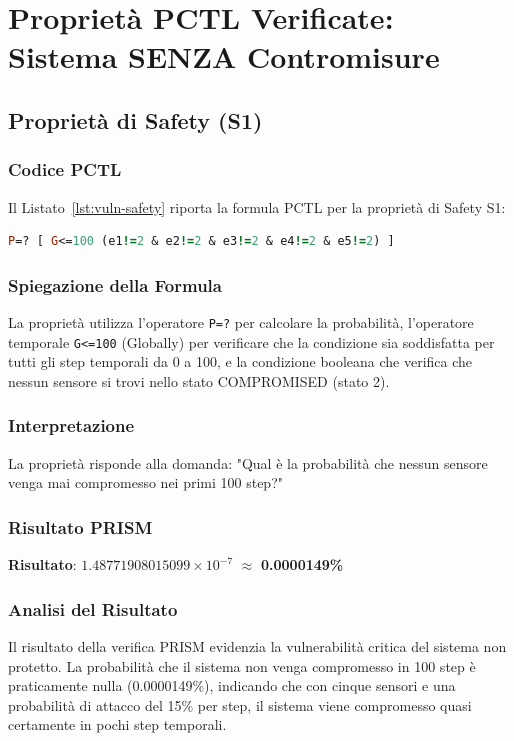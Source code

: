 \section{Proprietà PCTL Verificate: Sistema SENZA Contromisure}

\subsection{Proprietà di Safety (S1)}

\subsubsection{Codice PCTL}
Il Listato~\ref{lst:vuln-safety} riporta la formula PCTL per la proprietà di Safety S1:
\begin{lstlisting}[style=mystyle, language=Prolog, caption={Proprietà Safety S1 (vulnerabile)}, label=lst:vuln-safety]
P=? [ G<=100 (e1!=2 & e2!=2 & e3!=2 & e4!=2 & e5!=2) ]
\end{lstlisting}

\subsubsection{Spiegazione della Formula}
La proprietà utilizza l'operatore \texttt{P=?} per calcolare la probabilità, l'operatore temporale \texttt{G<=100} (Globally) per verificare che la condizione sia soddisfatta per tutti gli step temporali da 0 a 100, e la condizione booleana che verifica che nessun sensore si trovi nello stato COMPROMISED (stato 2).

\subsubsection{Interpretazione}
La proprietà risponde alla domanda: "Qual è la probabilità che nessun sensore venga mai compromesso nei primi 100 step?"

\subsubsection{Risultato PRISM}
\textbf{Risultato}: $1.48771908015099 \times 10^{-7}$ $\approx$ \textbf{0.0000149\%}

\subsubsection{Analisi del Risultato}
Il risultato della verifica PRISM evidenzia la vulnerabilità critica del sistema non protetto. La probabilità che il sistema non venga compromesso in 100 step è praticamente nulla (0.0000149\%), indicando che con cinque sensori e una probabilità di attacco del 15\% per step, il sistema viene compromesso quasi certamente in pochi step temporali.

